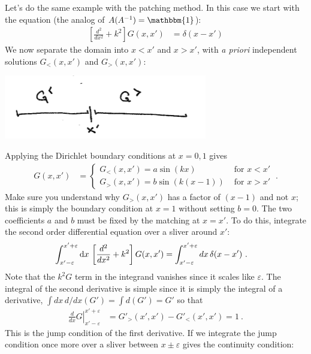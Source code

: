 \begin{example}\label{ex:patching:eg}
Let's do the same example with the patching method. In this case we start with the equation (the analog of $A(A^{-1}) =\mathbbm{1}$):
\begin{align}
  \left[\frac{d^2}{dx^2} + k^2\right]G(x,x') &= \delta(x-x')
\end{align}
We now separate the domain into $x<x'$ and $x>x'$, with \emph{a priori} independent solutions $G_<(x,x')$ and $G_>(x,x')$:
\begin{center}
\includegraphics[width=.5\textwidth]{figures/lec11_GgGl.png}
\end{center}
Applying the Dirichlet boundary conditions at $x=0,1$ gives
\begin{align}
  G(x,x') &=
  \begin{cases}
  G_<(x,x') = a\sin(kx) & \text{ for } x < x'\\
  G_>(x,x') = b\sin\left(k(x-1)\right) & \text{ for } x > x'
  \end{cases} \ .
\end{align}
Make sure you understand why $G_>(x,x')$ has a factor of $(x-1)$ and not $x$; this is simply the boundary condition at $x=1$ without setting $b=0$.
The two coefficients $a$ and $b$ must be fixed by the matching at $x=x'$. 
To do this, integrate the second order differential equation over a sliver around $x'$:
\begin{align}
  \int_{x'-\varepsilon}^{x'+\varepsilon}
  \operatorname{d}\mkern-3mu^{}\mkern-1mu{x} \, 
  \left[
   \frac{d^2}{dx^2} + k^2
  \right]
  G(x,x')
  &=
  \int_{x'-\varepsilon}^{x'+\varepsilon} dx\, \delta (x-x') \ .
  \label{eq:eg:jump:condition:integration:eg:1}
\end{align}
Note that the $k^2 G$ term in the integrand vanishes since it scales like $\varepsilon$. The integral of the second derivative is simple since it is simply the integral of a derivative, $\int dx\, d/dx(G') = \int d(G') = G'$ so that
\begin{align}
  \left.\frac{d}{dx}G\right|_{x'-\varepsilon}^{x'+\varepsilon}
  &=
  G'_>(x',x') - G'_<(x',x')
  =
   1 \ .
   \label{eq:eg:patching:jump:condition}
\end{align}
This is the jump condition of the first derivative. If we integrate the jump condition once more over a sliver between $x\pm\varepsilon$ gives the continuity condition:

\end{example}
